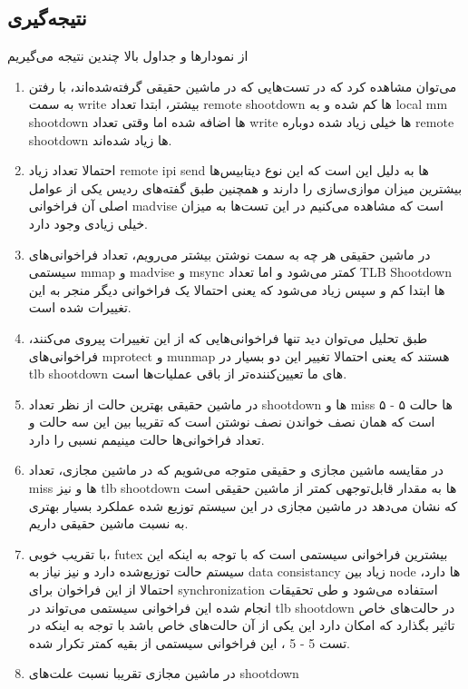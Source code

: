 \subsection{نتیجه‌گیری}
  از نمودارها و جداول بالا چندین نتیجه‌ می‌گیریم
 \begin{enumerate}
     \item می‌توان مشاهده کرد که در تست‌هایی که در ماشین حقیقی گرفته‌شده‌اند، با رفتن به سمت write بیشتر، ابتدا تعداد remote shootdown 
     ها کم شده و به  
     local mm shootdown 
     ها اضافه شده اما وقتی تعداد write 
     ها خیلی زیاد شده دوباره remote shootdown ها 
     زیاد شده‌اند.
    \item احتمالا تعداد زیاد remote ipi send 
    ها به دلیل این است که این نوع دیتابیس‌ها بیشترین میزان موازی‌سازی را دارند و همچنین طبق گفته‌های ردیس یکی از عوامل اصلی آن فراخوانی 
    madvise 
    است که مشاهده می‌کنیم در این تست‌ها به میزان خیلی زیادی وجود دارد.
    \item در ماشین حقیقی هر چه به سمت نوشتن بیشتر می‌رویم، تعداد فراخوانی‌های سیستمی  mmap و madvise و msync کمتر می‌شود و اما تعداد TLB Shootdown ها ابتدا کم و سپس زیاد می‌شود که یعنی احتمالا یک فراخوانی دیگر منجر به این تغییرات شده است.
    \item طبق تحلیل می‌توان دید تنها فراخوانی‌هایی که از این تغییرات پیروی می‌کنند، فراخوانی‌های 
    mprotect و 
    munmap 
    هستند که یعنی احتمالا تغییر این دو بسیار در tlb shootdown
    های ما تعیین‌کننده‌تر از باقی عملیات‌ها است.
    \item در ماشین حقیقی بهترین حالت از نظر تعداد shootdown ها و miss ها حالت 
    ۵ - ۵ 
    است که همان نصف خواندن نصف نوشتن است که تقریبا بین این سه حالت و تعداد فراخوانی‌ها حالت مینیمم نسبی را دارد.
    \item 
    در مقایسه ماشین مجازی و حقیقی متوجه می‌شویم که در ماشین مجازی، تعداد miss ها و نیز tlb shootdown 
    ها به مقدار قابل‌توجهی کمتر از ماشین حقیقی است که نشان می‌دهد در ماشین مجازی در این سیستم توزیع شده عملکرد بسیار بهتری به نسبت ماشین حقیقی داریم.
    \item 
    با تقریب خوبی،‌ 
    futex 
    بیشترین فراخوانی سیستمی است که با توجه به اینکه این سیستم حالت توزیع‌شده دارد و نیز نیاز به data consistancy زیاد بین node ها دارد،‌ احتمالا از این فراخوان برای synchronization استفاده می‌شود و طی تحقیقات انجام شده این فراخوانی سیستمی می‌تواند در tlb shootdown در 
    حالت‌های خاص تاثیر بگذارد که امکان دارد این یکی از آن حالت‌های خاص باشد با توجه به اینکه در تست 5 - 5 ،
    این فراخوانی سیستمی از بقیه کمتر تکرار شده.
    \item 
    در ماشین مجازی تقریبا نسبت‌ علت‌های shootdown 

\end{enumerate}
